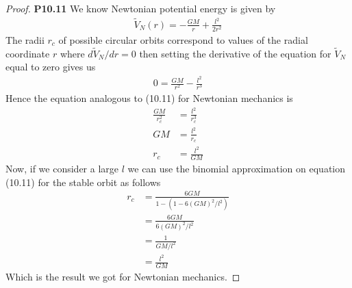 \documentclass[11pt]{article}
\theoremstyle{definition}
\begin{document}
\begin{proof}{\textbf{P10.11}}
    We know Newtonian potential energy is given by
    \begin{align*}
        \tilde{V}_N(r) = - \frac{GM}{r} + \frac{l^2}{2r^2}
    \end{align*}
    The radii $r_c$ of possible circular orbits correspond to values of the
    radial coordinate $r$ where $d\tilde{V}_N/dr = 0$ then setting the derivative
    of the equation for $\tilde{V}_N$ equal to zero gives us
    \begin{align*}
        0 = \frac{GM}{r^2} - \frac{l^2}{r^3}
    \end{align*}
    Hence the equation analogous to (10.11) for Newtonian mechanics is
    \begin{align*}
        \frac{GM}{r_c^2} &= \frac{l^2}{r_c^3}\\
        GM &= \frac{l^2}{r_c}\\
        r_c &= \frac{l^2}{GM}
    \end{align*}
    Now, if we consider a large $l$ we can use the binomial approximation
    on equation (10.11) for the stable orbit as follows
    \begin{align*}
        r_c &= \frac{6GM}{1 - (1 - 6(GM)^2/l^2)}\\
        &= \frac{6GM}{6(GM)^2/l^2}\\
        &= \frac{1}{GM/l^2}\\
        &= \frac{l^2}{GM}
    \end{align*}
    Which is the result we got for Newtonian mechanics.
\end{proof}
\cleardoublepage
\end{document}
